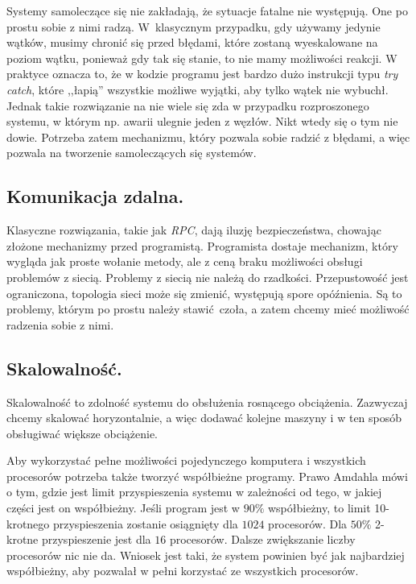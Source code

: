 \documentclass[oneside, 11pt, a4paper]{article}
\begin{document}
\begin{multicols}{2}
Systemy samoleczące się nie zakładają, że sytuacje fatalne nie występują. One po prostu sobie z nimi radzą. \mbox{W klasycznym} przypadku, gdy używamy jedynie wątków, musimy chronić się przed błędami, które zostaną wyeskalowane na poziom wątku, ponieważ gdy tak się stanie, to nie mamy możliwości reakcji. W praktyce oznacza to, że w kodzie programu jest bardzo dużo instrukcji typu \emph{try catch}, które ,,łapią'' wszystkie możliwe wyjątki, aby tylko wątek nie wybuchł. Jednak takie rozwiązanie na nie wiele się zda w przypadku rozproszonego systemu, w którym np. awarii ulegnie jeden z węzłów. Nikt wtedy się o tym nie dowie. Potrzeba zatem mechanizmu, który pozwala sobie radzić z błędami, a więc pozwala na tworzenie samoleczących się systemów.

\subsection{Komunikacja zdalna.}
Klasyczne rozwiązania, takie jak \emph{RPC}, dają iluzję bezpieczeństwa, chowając złożone mechanizmy przed programistą. Programista dostaje mechanizm, który wygląda jak proste wołanie metody, ale z ceną braku możliwości obsługi problemów z siecią. Problemy z siecią nie należą do rzadkości. Przepustowość jest ograniczona, topologia sieci może się zmienić, występują spore opóźnienia. Są to problemy, którym po prostu należy stawić czoła, a zatem chcemy mieć możliwość radzenia sobie z nimi. 

\subsection{Skalowalność.}
Skalowalność to zdolność systemu do obsłużenia rosnącego obciążenia. Zazwyczaj chcemy skalować horyzontalnie, a więc dodawać kolejne maszyny i w ten sposób obsługiwać większe obciążenie. 

Aby wykorzystać pełne możliwości pojedynczego komputera i wszystkich procesorów potrzeba także tworzyć współbieżne programy. Prawo Amdahla mówi o tym, gdzie jest limit przyspieszenia systemu w zależności od tego, w jakiej części jest on współbieżny. Jeśli program jest w $90\%$ współbieżny, to limit 10-krotnego przyspieszenia zostanie osiągnięty dla $1024$ procesorów. Dla $50\%$ 2-krotne przyspieszenie jest dla $16$ procesorów. Dalsze zwiększanie liczby procesorów nic nie da. Wniosek jest taki, że system powinien być jak najbardziej współbieżny, aby pozwalał w pełni korzystać ze wszystkich procesorów.


\end{multicols}
\end{document}
